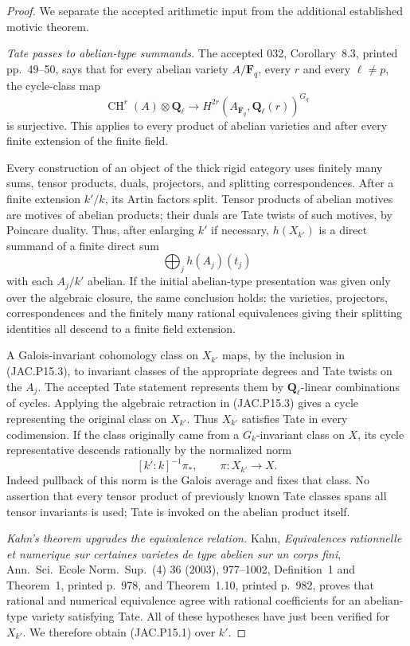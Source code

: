 \documentclass[11pt,a4paper]{article}
\begin{document}
\begin{proof}
We separate the accepted arithmetic input from the additional
established motivic theorem.

\emph{Tate passes to abelian-type summands.}
The accepted 032, Corollary~8.3, printed pp.~49--50, says that for every abelian variety
$A/\mathbf F_q$, every $r$ and every $\ell\ne p$, the cycle-class
map
\[
 \operatorname{CH}^r(A)\otimes\mathbf Q_\ell
   \longrightarrow H^{2r}(A_{\overline{\mathbf F}_q},
                         \mathbf Q_\ell(r))^{G_q}
\]
is surjective. This applies to every product of abelian varieties
and after every finite extension of the finite field.

Every construction of an object of the thick rigid category uses
finitely many sums, tensor products, duals, projectors, and splitting
correspondences. After a finite extension $k'/k$, its Artin factors
split. Tensor products of abelian motives are motives of abelian
products; their duals are Tate twists of such motives, by Poincare
duality. Thus, after enlarging $k'$ if necessary, $h(X_{k'})$ is
a direct summand of a finite direct sum
\[
              \bigoplus_j h(A_j)(t_j)                    \tag{JAC.P15.3}
\]
with each $A_j/k'$ abelian. If the initial abelian-type presentation
was given only over the algebraic closure, the same conclusion
holds: the varieties, projectors, correspondences and the finitely
many rational equivalences giving their splitting identities all
descend to a finite field extension.

A Galois-invariant cohomology class on $X_{k'}$ maps, by the
inclusion in (JAC.P15.3), to invariant classes of the appropriate
degrees and Tate twists on the $A_j$. The accepted Tate statement
represents them by $\mathbf Q_\ell$-linear combinations of cycles.
Applying the algebraic retraction in (JAC.P15.3) gives a cycle
representing the original class on $X_{k'}$. Thus $X_{k'}$ satisfies
Tate in every codimension. If the class originally came from a
$G_k$-invariant class on $X$, its cycle representative descends
rationally by the normalized norm
\[
           [k':k]^{-1}\pi_*,\qquad \pi:X_{k'}\to X.
\]
Indeed pullback of this norm is the Galois average and fixes that
class. No assertion that every tensor product of previously known
Tate classes spans all tensor invariants is used; Tate is invoked
on the abelian product itself.

\emph{Kahn's theorem upgrades the equivalence relation.}
Kahn, \emph{Equivalences rationnelle et numerique sur certaines
varietes de type abelien sur un corps fini}, Ann.\ Sci.\ Ecole
Norm.\ Sup.\ (4) 36 (2003), 977--1002, Definition~1 and Theorem~1,
printed p.~978, and Theorem~1.10, printed p.~982, proves that
rational and numerical equivalence agree with rational
coefficients for an abelian-type variety satisfying Tate.
All of these hypotheses have just been verified for $X_{k'}$.
We therefore obtain (JAC.P15.1) over $k'$.


\end{proof}
\end{document}

